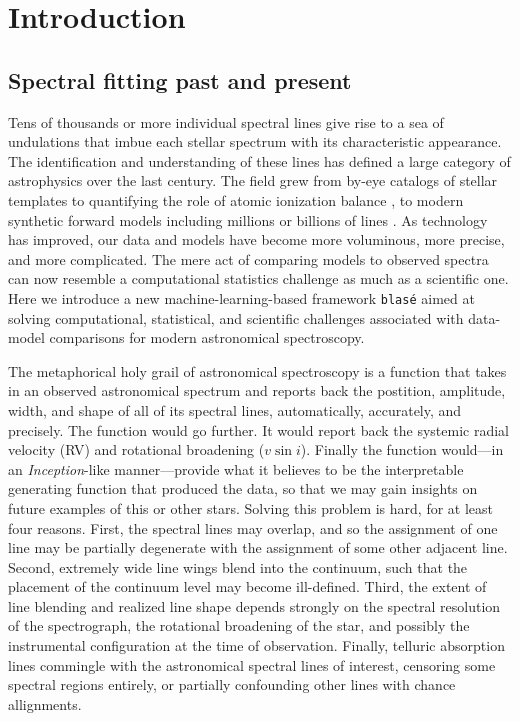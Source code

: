 \documentclass[modern]{aastex631}
\begin{document}

\section{Introduction}\label{sec:intro}

\subsection{Spectral fitting past and present}

Tens of thousands or more individual spectral lines give rise to a sea of undulations that imbue each stellar spectrum with its characteristic appearance.  The identification and understanding of these lines has defined a large category of astrophysics over the last century.  The field grew from by-eye catalogs of stellar templates \citep{1901AnHar..28..129C} to quantifying the role of atomic ionization balance \citep{1925PhDT.........1P}, to modern synthetic forward models including millions or billions of lines \citep{husser13, 2021ApJ...920...85M}.  As technology has improved, our data and models have become more voluminous, more precise, and more complicated.  The mere act of comparing models to observed spectra can now resemble a computational statistics challenge as much as a scientific one.  Here we introduce a new machine-learning-based framework \texttt{blas\'e} aimed at solving computational, statistical, and scientific challenges associated with data-model comparisons for modern astronomical spectroscopy.

The metaphorical holy grail of astronomical spectroscopy is a function that takes in an observed astronomical spectrum and reports back the postition, amplitude, width, and shape of all of its spectral lines, automatically, accurately, and precisely.  The function would go further. It would report back the systemic radial velocity (RV) and rotational broadening ($v\sin{i}$).  Finally the function would---in an \emph{Inception}-like manner---provide what it believes to be the interpretable generating function that produced the data, so that we may gain insights on future examples of this or other stars.  Solving this problem is hard, for at least four reasons.  First, the spectral lines may overlap, and so the assignment of one line may be partially degenerate with the assignment of some other adjacent line.  Second, extremely wide line wings blend into the continuum, such that the placement of the continuum level may become ill-defined.  Third, the extent of line blending and realized line shape depends strongly on the spectral resolution of the spectrograph, the rotational broadening of the star, and possibly the instrumental configuration at the time of observation.  Finally, telluric absorption lines commingle with the astronomical spectral lines of interest, censoring some spectral regions entirely, or partially confounding other lines with chance allignments.
\end{document}
